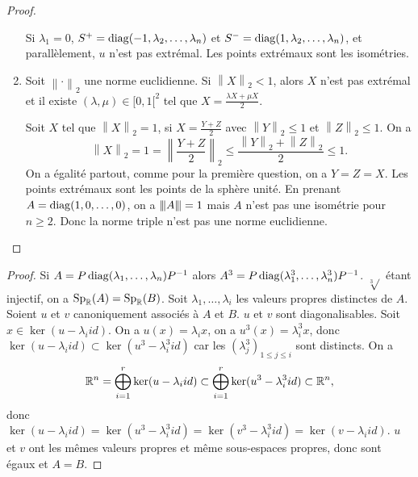 \documentclass[12pt]{article}
\begin{document}
\begin{proof}
\begin{enumerate}
		Si $\lambda_1=0$, $S^{+}=\operatorname{diag}(-1,\lambda_2,\dots,\lambda_n)$ et $S^{-}=\operatorname{diag}(1,\lambda_2,\dots,\lambda_n)$, et parallèlement, $u$ n'est pas extrémal. Les points extrémaux sont les isométries.

		\item Soit $\left\lVert\cdot\right\rVert_2$ une norme euclidienne. Si $\left\lVert X\right\rVert_{2}<1$, alors $X$ n'est pas extrémal et il existe $(\lambda,\mu)\in[0,1[^{2}$ tel que $X=\frac{\lambda X+\mu X}{2}$.
		
		Soit $X$ tel que $\left\lVert X\right\rVert_{2}=1$, si $X=\frac{Y+Z}{2}$ avec $\left\lVert Y\right\rVert_{2}\leqslant1$ et $\left\lVert Z\right\rVert_{2}\leqslant1$. On a 
		\begin{equation}
			\left\lVert X\right\rVert_{2}=1=\left\lVert\frac{Y+Z}{2}\right\rVert_{2}\leqslant\frac{\left\lVert Y\right\rVert_{2}+\left\lVert Z\right\rVert_{2}}{2}\leqslant1.
		\end{equation}
		On a égalité partout, comme pour la première question, on a $Y=Z=X$. Les points extrémaux sont les points de la sphère unité. En prenant $A=\operatorname{diag}(1,0,\dots,0)$, on a ${\left\vert\kern-0.25ex\left\vert\kern-0.25ex\left\vert{}A \right\vert\kern-0.25ex\right\vert\kern-0.25ex\right\vert}=1$ mais $A$ n'est pas une isométrie pour $n\geqslant2$. Donc la norme triple n'est pas une norme euclidienne.
	\end{enumerate}
\end{proof}

\begin{proof}
	Si $A=P\operatorname{diag}(\lambda_1,\dots,\lambda_n)P^{-1}$ alors $A^{3}=P\operatorname{diag}(\lambda_1^{3},\dots,\lambda_n^{3})P^{-1}$. $\sqrt[3]{}$ étant injectif, on a $\operatorname{Sp}_{\mathbb{R}}(A)=\operatorname{Sp}_{\mathbb{R}}(B)$. Soit $\lambda_1,\dots,\lambda_i$ les valeurs propres distinctes de $A$. Soient $u$ et $v$ canoniquement associés à $A$ et $B$. $u$ et $v$ sont diagonalisables. Soit $x\in\ker(u-\lambda_i id)$. On a $u(x)=\lambda_i x$, on a $u^{3}(x)=\lambda_{i}^{3}x$, donc $\ker(u-\lambda_i id)\subset\ker(u^{3}-\lambda_i^{3}id)$ car les $(\lambda_j^{3})_{1\leqslant j\leqslant i}$ sont distincts. On a 
	\begin{equation}
		\mathbb{R}^{n}=\bigoplus_{i=1}^{r}\ker(u-\lambda_i id)\subset\bigoplus_{i=1}^{r}\ker(u^{3}-\lambda_i^{3}id)\subset\mathbb{R}^{n},
	\end{equation}
	donc $\ker(u-\lambda_i id)=\ker(u^{3}-\lambda_i^{3}id)=\ker(v^{3}-\lambda_i^{3}id)=\ker(v-\lambda_i id)$. $u$ et $v$ ont les mêmes valeurs propres et même sous-espaces propres, donc sont égaux et $A=B$.
\end{proof}
\end{document}
